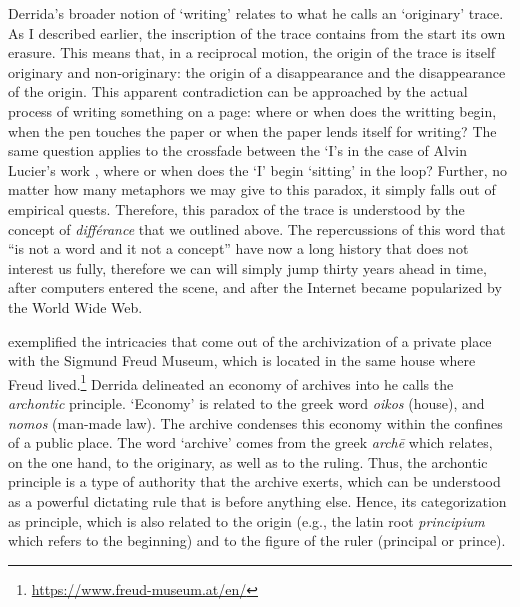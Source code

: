 Derrida's broader notion of `writing' relates to what he calls an `originary' trace. As I described earlier, the inscription of the trace contains from the start its own erasure. This means that, in a reciprocal motion, the origin of the trace is itself originary and non-originary: the origin of a disappearance and the disappearance of the origin. This apparent contradiction can be approached by the actual process of writing something on a page: where or when does the writting begin, when the pen touches the paper or when the paper lends itself for writing? The same question applies to the crossfade between the `I's in the case of Alvin Lucier's work , where or when does the `I' begin `sitting' in the loop? Further, no matter how many metaphors we may give to this paradox, it simply falls out of empirical quests. Therefore, this paradox of the trace is understood by the concept of \textit{différance} that we outlined above. The repercussions of this word that ``is not a word and it not a concept'' have now a long history that does not interest us fully, therefore we can will simply jump thirty years ahead in time, after computers entered the scene, and after the Internet became popularized by the World Wide Web.


\textcite{Der95:Arc} exemplified the intricacies that come out of the archivization of a private place with the Sigmund Freud Museum, which is located in the same house where Freud lived.\footnote{\url{https://www.freud-museum.at/en/}} Derrida delineated an economy of archives into he calls the \textit{archontic} principle. `Economy' is related to the greek word \textit{oikos} (house), and \textit{nomos} (man-made law). The archive condenses this economy within the confines of a public place. The word `archive' comes from the greek \textit{archē} which relates, on the one hand, to the originary, as well as to the ruling. Thus, the archontic principle is a type of authority that the archive exerts, which can be understood as a powerful dictating rule that is before anything else. Hence, its categorization as principle, which is also related to the origin (e.g., the latin root \textit{principium} which refers to the beginning) and to the figure of the ruler (principal or prince). 

